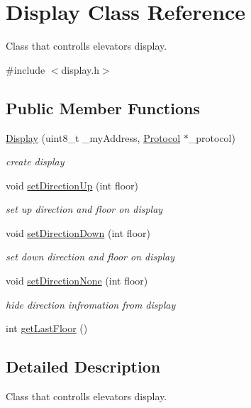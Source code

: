 \hypertarget{classDisplay}{}\section{Display Class Reference}
\label{classDisplay}


Class that controlls elevator\textquotesingle{}s display.  




{\ttfamily \#include $<$display.\+h$>$}

\subsection*{Public Member Functions}
\begin{DoxyCompactItemize}
\item 
\hyperlink{classDisplay_a66f71cdfe11b39d5b53137675905d170}{Display} (uint8\+\_\+t \+\_\+my\+Address, \hyperlink{classProtocol}{Protocol} $\ast$\+\_\+protocol)
\begin{DoxyCompactList}\small\item\em create display \end{DoxyCompactList}\item 
void \hyperlink{classDisplay_a50080126c6dc402d922a4f1c9bcfcb8b}{set\+Direction\+Up} (int floor)
\begin{DoxyCompactList}\small\item\em set up direction and floor on display \end{DoxyCompactList}\item 
void \hyperlink{classDisplay_a6244d2fcce88bb8880f3348fcaba5e77}{set\+Direction\+Down} (int floor)
\begin{DoxyCompactList}\small\item\em set down direction and floor on display \end{DoxyCompactList}\item 
void \hyperlink{classDisplay_af2e646c93b6d6c1696df35231ad9f87e}{set\+Direction\+None} (int floor)
\begin{DoxyCompactList}\small\item\em hide direction infromation from display \end{DoxyCompactList}\item 
int \hyperlink{classDisplay_a5b98e4001a790074ca7ef6ae93dae63d}{get\+Last\+Floor} ()
\end{DoxyCompactItemize}


\subsection{Detailed Description}
Class that controlls elevator\textquotesingle{}s display. 

